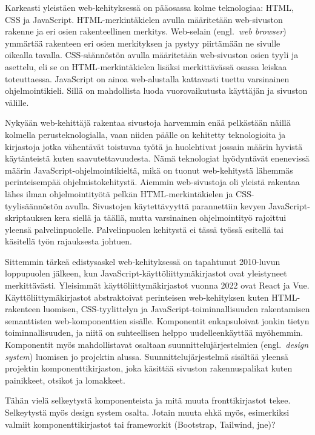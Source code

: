 \documentclass[finnish, 12pt, a4paper, elec, utf8, a-1b, online]{aaltothesis}
\begin{document}
Karkeasti yleistäen web-kehityksessä on pääosassa kolme teknologiaa: HTML, CSS
ja JavaScript. HTML-merkintäkielen avulla määritetään web-sivuston rakenne ja
eri osien rakenteellinen merkitys. Web-selain (engl.~\textit{web browser})
ymmärtää rakenteen eri osien merkityksen ja pystyy piirtämään ne sivulle
oikealla tavalla. CSS-säännöstön avulla määritetään web-sivuston osien tyyli ja
asettelu, eli se on HTML-merkintäkielen lisäksi merkittävässä osassa leiskaa
toteuttaessa. JavaScript on ainoa web-alustalla kattavasti tuettu varsinainen
ohjelmointikieli. Sillä on mahdollista luoda vuorovaikutusta käyttäjän ja
sivuston välille.

Nykyään web-kehittäjä rakentaa sivustoja harvemmin enää pelkästään näillä
kolmella perusteknologialla, vaan niiden päälle on kehitetty teknologioita ja
kirjastoja jotka vähentävät toistuvaa työtä ja huolehtivat jossain määrin
hyvistä käytänteistä kuten saavutettavuudesta. Nämä teknologiat hyödyntävät
enenevissä määrin JavaScript-ohjelmointikieltä, mikä on tuonut web-kehitystä
lähemmäs perinteisempää ohjelmistokehitystä. Aiemmin web-sivustoja oli yleistä
rakentaa lähes ilman ohjelmointityötä pelkän HTML-merkintäkielen ja
CSS-tyylisäännöstön avulla. Sivustojen käytettävyyttä parannettiin kevyen
JavaScript-skriptauksen kera siellä ja täällä, mutta varsinainen ohjelmointityö
rajoittui yleensä palvelinpuolelle. Palvelinpuolen kehitystä ei tässä työssä
esitellä tai käsitellä työn rajauksesta johtuen.

Sittemmin tärkeä edistysaskel web-kehityksessä on tapahtunut 2010-luvun
loppupuolen jälkeen, kun JavaScript-käyttöliittymäkirjastot ovat yleistyneet
merkittävästi. Yleisimmät käyttöliittymäkirjastot vuonna 2022 ovat React ja Vue.
Käyttöliittymäkirjastot abstraktoivat perinteisen web-kehityksen kuten
HTML-rakenteen luomisen, CSS-tyylittelyn ja JavaScript-toiminnallisuuden
rakentamisen semanttisten web-komponenttien sisälle. Komponentit enkapsuloivat
jonkin tietyn toiminnallisuuden, ja niitä on suhteellisen helppo
uudelleenkäyttää myöhemmin. Komponentit myös mahdollistavat osaltaan
suunnittelujärjestelmien (engl.~\textit{design system}) luomisen jo projektin
alussa. Suunnittelujärjestelmä sisältää yleensä projektin komponenttikirjaston,
joka käsittää sivuston rakennuspalikat kuten painikkeet, otsikot ja lomakkeet.

Tähän vielä selkeytystä komponenteista ja mitä muuta fronttikirjastot tekee.
Selkeytystä myös design system osalta. Jotain muuta ehkä myös, esimerkiksi valmiit
komponenttikirjastot tai frameworkit (Bootstrap, Tailwind, jne)?
\end{document}

